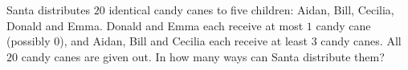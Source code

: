 Santa distributes $20$ identical candy canes to five children: Aidan, Bill, Cecilia, Donald and Emma. Donald and Emma each receive at most $1$ candy cane (possibly $0$), and Aidan, Bill and Cecilia each receive at least $3$ candy canes. All $20$ candy canes are given out. In how many ways can Santa distribute them?
